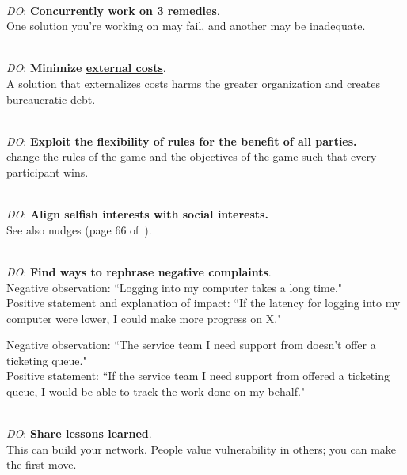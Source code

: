 \ \\
\textit{DO}: \textbf{Concurrently work on 3 remedies}.\\
One solution you're working on may fail, and another may be inadequate. 

\ \\
\textit{DO}: \textbf{Minimize \href{https://en.wikipedia.org/wiki/Externality}{external costs}}.\\
A solution that externalizes costs harms the greater organization and creates bureaucratic debt.

\ \\
\textit{DO}: \textbf{Exploit the flexibility of rules for the benefit of all parties.}\\
change the rules of the game and the objectives of the game such that every participant wins.

\ \\
\textit{DO}: \textbf{Align selfish interests with social interests.}\\
See also nudges
(page 66 of~\cite{2012_Schneier}).

\ \\
\textit{DO}: \textbf{Find ways to rephrase negative complaints}.\\
Negative observation: ``Logging into my computer takes a long time."\\
Positive statement and explanation of impact: ``If the latency for logging into my computer were lower, I could make more progress on X."


Negative observation: ``The service team I need support from doesn't offer a ticketing queue."\\
Positive statement: ``If the service team I need support from offered a ticketing queue, I would be able to track the work done on my behalf."

\ \\
\textit{DO}: \textbf{Share lessons learned}.\\
This can build your network. People value vulnerability in others; you can make the first move. 